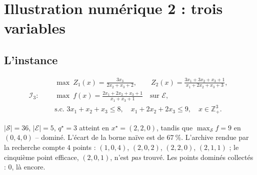 \documentclass[11pt,a4paper]{article}
\theoremstyle{plain}
\theoremstyle{remark}
\newcommand{\Ecal}{\mathcal{E}}
\newcommand{\Scal}{\mathcal{S}}
\newcommand{\qs}{q^{\star}}
\begin{document}
\section{Illustration numérique 2 : trois variables}
\label{sec:illus3}

\subsection{L'instance}

\[
\mathcal{I}_3:\quad
\begin{aligned}
  &\max\ Z_1(x)=\frac{3x_3}{2x_2+x_3+2},
   \qquad Z_2(x)=\frac{3x_1+3x_2+x_3+1}{x_1+2x_2+x_3+3},\\[3pt]
  &\max\ f(x)=\frac{2x_1+2x_2+x_3+1}{x_1+x_3+1}\quad\text{sur }\Ecal,\\[3pt]
  &\text{s.c. } 3x_1+x_2+x_3\le 8,\quad x_1+2x_2+2x_3\le 9,
   \quad x\in\mathbb{Z}^3_+ .
\end{aligned}
\]

\noindent
$|\Scal|=36$, $|\Ecal|=5$, $\qs=3$ atteint en $x^{\star}=(2,2,0)$, tandis que
$\max_{\Scal}f=9$ en $(0,4,0)$ -- dominé. L'écart de la borne naïve est de
$67\ \%$. L'archive rendue par la recherche compte $4$ points :
$(1,0,4)$, $(2,0,2)$, $(2,2,0)$, $(2,1,1)$ ; le cinquième point efficace,
$(2,0,1)$, n'est \emph{pas} trouvé. Les points dominés collectés : $0$,
là encore.
\end{document}
